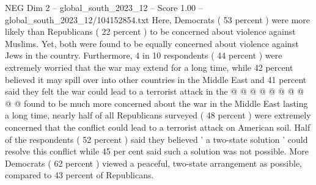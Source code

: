 \begin{textsample}{NEG Dim 2 – global\_south\_2023\_12 – Score 1.00 – global\_south\_2023\_12/104152854.txt}
Here, Democrats ( 53 percent ) were more likely than Republicans ( 22 percent ) to be concerned about violence against Muslims.
Yet, both were found to be equally concerned about violence against Jews in the country.
Furthermore, 4 in 10 respondents ( 44 percent ) were extremely worried that the war may extend for a long time, while 42 percent believed it may spill over into other countries in the Middle East and 41 percent said they felt the war could lead to a terrorist attack in the @ @ @ @ @ @ @ @ @ @ found to be much more concerned about the war in the Middle East lasting a long time, nearly half of all Republicans surveyed ( 48 percent ) were extremely concerned that the conflict could lead to a terrorist attack on American soil.
Half of the respondents ( 52 percent ) said they believed ' a two-state solution ' could resolve this conflict while 45 per cent said such a solution was not possible.
More Democrats ( 62 percent ) viewed a peaceful, two-state arrangement as possible, compared to 43 percent of Republicans.

\end{textsample}
